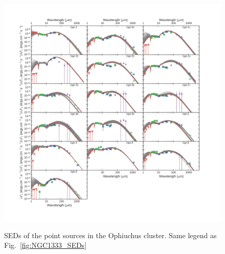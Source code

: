 \begin{figure}
\begin{center}
\hspace*{-1.5in}
\includegraphics[width=1.4\textwidth]{Figures/Oph_SEDs.png}
\label{fig:Oph_SEDs}
\caption[Ophiuchus SEDs]{SEDs of the point sources in the Ophiuchus cluster. Same legend as Fig.~\ref{fig:NGC1333_SEDs}}
\end{center}
\end{figure}

